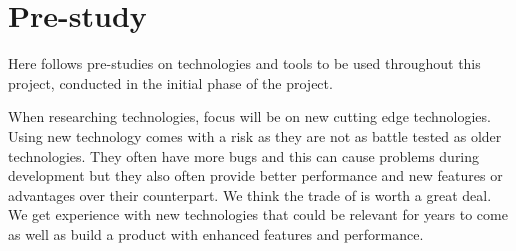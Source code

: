 \chapter{Pre-study}

Here follows pre-studies on technologies and tools to be used throughout this project, conducted in the initial phase of the project.

When researching technologies, focus will be on new cutting edge technologies. Using new technology comes with a risk as they are not as battle tested as older technologies. They often have more bugs and this can cause problems during development but they also often provide better performance and new features or advantages over their counterpart. We think the trade of is worth a great deal. We get experience with new technologies that could be relevant for years to come as well as build a product with enhanced features and performance.






